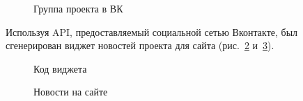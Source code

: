 \begin{figure}[h!]
\caption{Группа проекта в ВК}
\label{lob_5:lob_5}
\end{figure}

Используя API, предоставляемый социальной сетью Вконтакте, был сгенерирован виджет новостей проекта для сайта (рис.~\ref{lob_6:lob_6} и~\ref{lob_7:lob_7}).

\begin{figure}[h!]
\caption{Код виджета}
\label{lob_6:lob_6}
\end{figure}

\begin{figure}[h!]
\caption{Новости на сайте}
\label{lob_7:lob_7}
\end{figure}

\clearpage
	
